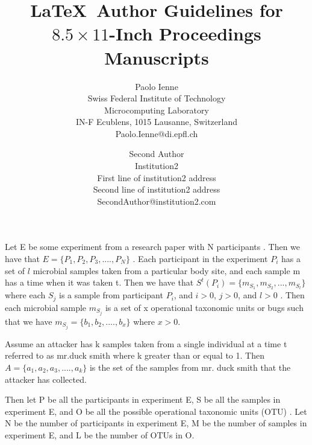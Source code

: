 \documentclass[times, 10pt,twocolumn]{article}
\begin{document}
\title{\LaTeX\ Author Guidelines 
       for {\boldmath $8.5 \times 11$-Inch} Proceedings Manuscripts}

\author{Paolo Ienne\\
Swiss Federal Institute of Technology\\ Microcomputing Laboratory \\ IN-F 
Ecublens, 1015 Lausanne, Switzerland\\ Paolo.Ienne@di.epfl.ch\\
\and
Second Author\\
Institution2\\
First line of institution2 address\\ Second line of institution2 address\\ 
SecondAuthor@institution2.com\\
}

\maketitle
\thispagestyle{empty}


 Let E be some experiment from a research paper with N participants . Then we have that
$ E = \{ P_1, P_2, P_3, ...., P_N \}$ . Each participant in the experiment $P_i$  has a set of $l$ microbial samples taken from a particular body site, and  each sample m has a time when it was taken t. Then we have that $S^t(P_i) = \{ m_{S_1} , m_{S_2}, ...,  m_ {S_l} \}$  where each $S_j$ is a sample from participant $P_i$, and $ i > 0$, $j > 0$, and $ l > 0$ .  Then each microbial sample $m_{S_j}$ is a set of x operational taxonomic units or bugs such that we have $m_{S_j} = \{ b_1, b_2, ...., b_x\}$  where $x > 0$.  

Assume an attacker has k samples taken from a single individual at a time t referred to as mr.duck smith where k greater than or equal to 1. 
Then $A = \{ a_1, a_2, a_3, ...., a_k \}$  is the set of the samples from mr. duck smith that the attacker has collected. 

Then let P be all the participants in experiment E, S be all the samples in experiment E, and O be all the possible operational taxonomic units (OTU) . Let N be the number of participants in experiment E, M be the number of samples in experiment E, and L be the number of OTUs in O. 
\end{document}
